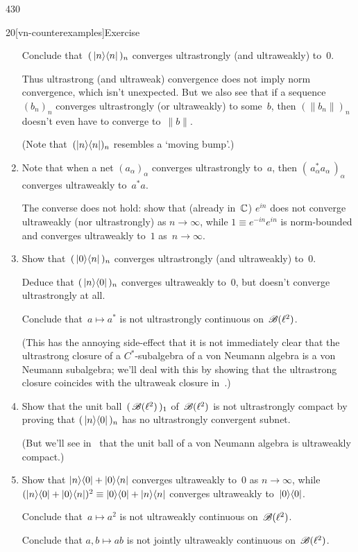 \begin{parsec}{430}
\begin{point}{20}[vn-counterexamples]{Exercise}
\begin{enumerate}
Conclude that~$(\,\ketbra{n}{n}\,)_n$
converges ultrastrongly (and ultraweakly) to~$0$.

Thus ultrastrong (and ultraweak) convergence does not imply norm convergence,
which isn't unexpected.
But we also see that if a sequence~$(b_n)_n$ converges ultrastrongly
(or ultraweakly) to some~$b$,
then $(\|b_n\|)_n$ doesn't even have to converge to~$\|b\|$.

(Note that~$(\ketbra{n}{n})_n$ resembles a `moving bump'.)
\item
Note that when a net $(a_\alpha)_\alpha$
converges ultrastrongly to~$a$,
then $(\,a_\alpha^*a_\alpha\,)_\alpha$
converges ultraweakly to~$a^*a$.

The converse does not hold:
show that (already in~$\mathbb{C}$)
$e^{in}$
does not converge ultraweakly 
(nor ultrastrongly) as $n\to \infty$,
while $1\equiv e^{-in} e^{in}$
is norm-bounded and
converges ultraweakly to~$1$ as~$n\to\infty$.
\item
\label{vn-counterexamples-4}
Show that~$(\,\left|0\right>\!\left<n\right|\,)_n$ converges ultrastrongly 
(and ultraweakly) to~$0$.

Deduce that $(\,\left|n\right>\!\left<0\right|\,)_n$ converges ultraweakly to~$0$,
but doesn't converge ultrastrongly at all.

Conclude that~$a\mapsto a^*$ is not ultrastrongly continuous 
on~$\mathscr{B}(\ell^2)$.

(This has the annoying side-effect
that it is not immediately clear that the ultrastrong
closure of a $C^*$-subalgebra of a von Neumann algebra 
is a von Neumann subalgebra; we'll deal with this
by showing that the ultrastrong closure coincides
with the ultraweak closure in~.)
\item
Show that the unit ball~$(\,\mathscr{B}(\ell^2)\,)_1$
of~$\mathscr{B}(\ell^2)$ is not ultrastrongly compact
by proving that $(\,\left|n\right>\!\left<0\right|\,)_n$
has no ultrastrongly convergent subnet.

(But we'll see in~ that
the unit ball of a von Neumann algebra
is ultraweakly compact.)

\item
\label{vn-counterexamples-6}
Show that $\left|n\right>\!\left<0\right|+\left|0\right>\!\left<n\right|$
converges ultraweakly to~$0$ as $n\to \infty$,
while $(\left|n\right>\!\left<0\right|+\left|0\right>\!\left<n\right|)^2\equiv \left|0\right>\!\left<0\right|+\left|n\right>\!\left<n\right|$
converges ultraweakly to~$\left|0\right>\!\left<0\right|$.

Conclude that~$a\mapsto a^2$ is not ultraweakly continuous on~$\mathscr{B}(\ell^2)$.

Conclude that $a,b\mapsto ab$ is not jointly ultraweakly continuous
on~$\mathscr{B}(\ell^2)$.


\end{enumerate}
\end{point}
\end{parsec}
